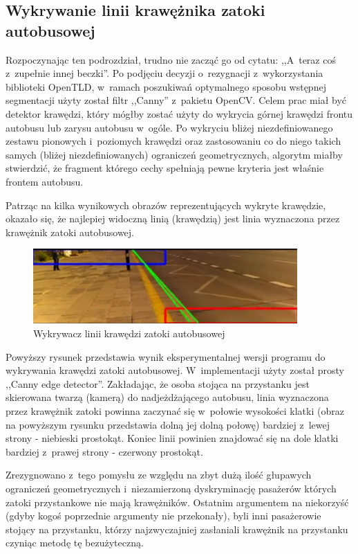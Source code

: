 \subsection{Wykrywanie linii krawężnika zatoki autobusowej}

Rozpoczynając ten podrozdział, trudno nie zacząć go od cytatu:
,,A~teraz coś z~zupełnie innej beczki''. Po podjęciu decyzji o~rezygnacji
z~wykorzystania
biblioteki OpenTLD, w~ramach poszukiwań optymalnego sposobu wstępnej
segmentacji użyty został filtr ,,Canny'' z~pakietu OpenCV. Celem prac
miał być detektor krawędzi, który mógłby zostać użyty do
wykrycia górnej krawędzi frontu autobusu lub zarysu autobusu w~ogóle.
Po wykryciu bliżej niezdefiniowanego zestawu pionowych i~poziomych
krawędzi oraz zastosowaniu co do niego takich samych (bliżej
niezdefiniowanych) ograniczeń geometrycznych, algorytm miałby
stwierdzić, że fragment którego cechy spełniają pewne kryteria jest
właśnie frontem autobusu.

Patrząc na kilka wynikowych obrazów reprezentujących wykryte krawędzie,
okazało się, że najlepiej 
widoczną linią (krawędzią) jest linia wyznaczona przez krawężnik
zatoki autobusowej.

\begin{figure}[h!]
    \caption{Wykrywacz linii krawędzi zatoki autobusowej}
    \centering
    \includegraphics[width=0.9\textwidth]{img/exp_bus_lane_edge_detector}
\end{figure}

Powyższy rysunek przedstawia wynik eksperymentalnej wersji programu do
wykrywania krawędzi zatoki autobusowej. W~implementacji użyty
został prosty ,,Canny edge detector''. Zakładając, że osoba stojąca
na przystanku jest skierowana twarzą (kamerą) do nadjeżdżającego autobusu,
linia wyznaczona przez krawężnik zatoki powinna zaczynać się w~połowie
wysokości klatki (obraz na powyższym rysunku przedstawia dolną jej dolną
połowę) bardziej z~lewej strony - niebieski prostokąt. Koniec linii
powinien znajdować się na dole klatki bardziej z~prawej strony - czerwony
prostokąt.

Zrezygnowano z~tego pomysłu ze względu na zbyt dużą ilość głupawych
ograniczeń geometrycznych i~niezamierzoną dyskryminację pasażerów
których zatoki przystankowe nie mają krawężników. Ostatnim argumentem
na niekorzyść (gdyby kogoś poprzednie argumenty nie przekonały), 
byli inni pasażerowie stojący na przystanku, którzy najzwyczajniej
zasłaniali krawężnik na przystanku czyniąc metodę tę bezużyteczną.

